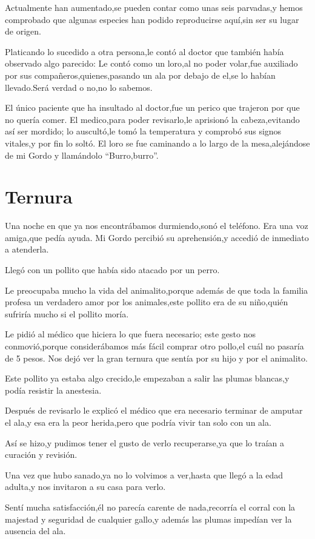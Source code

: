 \documentclass[letterpaper,12pt]{book}
\begin{document}
Actualmente han aumentado,se pueden contar como unas seis parvadas,y hemos comprobado que algunas especies han podido reproducirse aquí,sin ser su lugar de origen.

Platicando lo sucedido a otra persona,le contó al doctor que también había observado algo parecido: Le contó como un loro,al no poder volar,fue auxiliado por sus compañeros,quienes,pasando un ala por debajo de el,se lo habían llevado.Será verdad o no,no lo sabemos.

El único paciente que ha insultado al doctor,fue un perico que trajeron por que no quería comer. El medico,para poder revisarlo,le aprisionó la cabeza,evitando así ser mordido; lo auscultó,le tomó la temperatura y comprobó sus signos vitales,y por fin lo soltó. El loro se fue caminando a lo largo de la mesa,alejándose de mi Gordo y llamándolo ``Burro,burro''.


\chapter{Ternura}
Una noche en que ya nos encontrábamos durmiendo,sonó el teléfono. Era una voz amiga,que pedía ayuda. Mi Gordo percibió su aprehensión,y accedió de inmediato a atenderla. 

Llegó con un pollito que había sido atacado por un perro.

Le preocupaba mucho la vida del animalito,porque además de que toda la familia profesa un verdadero amor por los animales,este pollito era de su niño,quién sufriría mucho si el pollito moría. 

Le pidió al médico que hiciera lo que fuera necesario; este gesto nos conmovió,porque considerábamos más fácil comprar otro pollo,el cuál no pasaría de 5 pesos. Nos dejó ver la gran ternura que sentía por su hijo y por el animalito.

Este pollito ya estaba algo crecido,le empezaban a salir las plumas blancas,y podía resistir la anestesia. 

Después de revisarlo le explicó el médico que era necesario terminar de amputar el ala,y esa era la peor herida,pero que podría vivir tan solo con un ala.

Así se hizo,y pudimos tener el gusto de verlo recuperarse,ya que lo traían a curación y revisión. 

Una vez que hubo sanado,ya no lo volvimos a ver,hasta que llegó a la edad adulta,y nos invitaron a su casa para verlo.

Sentí mucha satisfacción,él no parecía carente de nada,recorría el corral con la majestad y seguridad de cualquier gallo,y además las plumas impedían ver la ausencia del ala.
\end{document}
